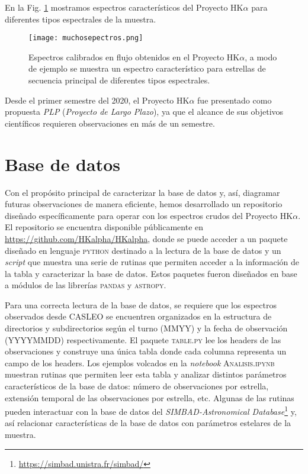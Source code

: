 \documentclass[baaa]{baaa}
\begin{document}
En la Fig. \ref{fig:esp} mostramos espectros característicos del Proyecto HK$\alpha$ para diferentes tipos espectrales de la muestra.
\begin{figure}[htb!]
    \texttt{[image: muchosepectros.png]}
    \caption{Espectros calibrados en flujo obtenidos en el Proyecto HK$\alpha$, a modo de ejemplo se muestra un espectro característico para estrellas de secuencia principal de diferentes tipos espectrales.}
    \label{fig:esp}
\end{figure}



Desde el primer semestre del 2020, el Proyecto HK$\alpha$ fue presentado como propuesta \emph{PLP} (\emph{Proyecto de Largo Plazo}), ya que el alcance de sus objetivos científicos requieren  observaciones en más de un semestre.


\section{Base de datos}\label{sec.base}
Con el propósito principal de caracterizar la base de datos y, así, diagramar futuras observaciones de manera eficiente, hemos desarrollado un repositorio diseñado específicamente para operar con los espectros crudos del Proyecto HK$\alpha$. El repositorio se encuentra disponible públicamente en \url{https://github.com/HKalpha/HKalpha}, donde se puede acceder a un paquete diseñado en lenguaje \textsc{python}  destinado  a la lectura de la base de datos  y un \textit{script} que muestra una serie de rutinas que permiten acceder a la información de la tabla y caracterizar la base de datos. Estos paquetes fueron diseñados en base a módulos  de las librerías  \textsc{pandas} y \textsc{astropy}.

Para una correcta lectura de la base de datos, se requiere que los espectros observados  desde CASLEO se encuentren organizados en la estructura de directorios  y subdirectorios según el turno (MMYY) y la fecha de observación (YYYYMMDD) respectivamente. El paquete \textsc{table.py} lee los headers de las observaciones y construye una única tabla  donde cada columna representa un campo de los headers. Los ejemplos volcados en la \emph{notebook} \textsc{Analisis.ipynb} muestran rutinas que permiten leer esta tabla y  analizar distintos parámetros característicos de la base de datos: número de observaciones por estrella, extensión temporal de las observaciones por estrella, etc. Algunas de las rutinas pueden interactuar con la base de datos del \textit{SIMBAD-Astronomical Database}\footnote{\url{https://simbad.unistra.fr/simbad/}} y, así relacionar características de la base de datos con parámetros estelares de la muestra. 
\end{document}
